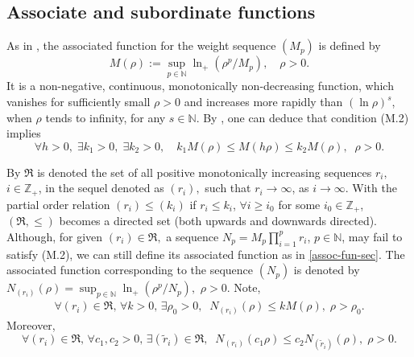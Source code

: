 \documentclass[sn-mathphys,Numbered]{sn-jnl}%
\theoremstyle{thmstyleone}%
\theoremstyle{thmstyletwo}%
\theoremstyle{thmstylethree}%
\begin{document}
\subsection{Associate and subordinate functions}


As in \cite{Komatsu1},  the associated function for the weight sequence $(M_p)$ is defined by
\begin{equation}\label{assoc-fun-sec}
M(\rho):=\sup_{p\in\mathbb N}\ln_+  (\rho^{p}/M_{p}),\quad \rho> 0.
\end{equation}
It is a non-negative, continuous, monotonically non-decreasing function, which vanishes for sufficiently small $\rho>0$ and increases more rapidly than $(\ln \rho)^s$, when $\rho$ tends to infinity, for any $s\in\mathbb N$. %
By \cite{Komatsu1}, one can deduce that condition (M.2) implies
\begin{equation*}\label{B-c}
\forall h>0, \;\exists k_1>0, \;\exists k_2>0, \quad  k_1M(\rho)\leq M(h \rho)\leq k_2 M(\rho), \;\;\rho>0.
\end{equation*}

By $\mathfrak{R}$ is denoted the set of all positive monotonically increasing sequences $r_i,$ $i\in\mathbb Z_+$, in the sequel denoted as $(r_i),$ such that $r_i\rightarrow \infty$, as $i\rightarrow \infty$. With the partial order relation $(r_i)\leq (k_i)$ if $r_i\leq k_i$,  $\forall i\geq i_0$ for some $i_0\in\mathbb Z_+$,  $(\mathfrak{R},\leq)$ becomes a directed set (both upwards and downwards directed). 
Although, for given $(r_i)\in\mathfrak{R},$ a sequence $N_p=M_p\prod_{i=1}^pr_i$,  $p\in\mathbb N$, may fail to satisfy (M.2), we can still define its associated function as in \eqref{assoc-fun-sec}.
The associated function corresponding to the sequence $(N_p)$ is denoted by $ N_{(r_i)}(\rho)=\sup_{p\in\mathbb N}\ln_{+}({\rho^p}/{N_p}),$ $\rho>0.$ Note,%
\begin{align*}
\forall (r_i)\in \mathfrak{R},\,\forall k>0, \,\exists \rho_0>0,\;\; N_{(r_i)}(\rho)\leq kM(\rho), \;\rho > \rho_0.
\end{align*}
Moreover,
\begin{equation*}\label{Ra}
\forall (r_i)\in\mathfrak{R}, \,\forall c_1,c_2>0, \,\exists (\tilde{r}_i)\in\mathfrak R,\;\; N_{(r_i)}(c_1\rho)\leq c_2N_{(\tilde r_i)}(\rho),\; \rho>0.
\end{equation*}
 
\end{document}
